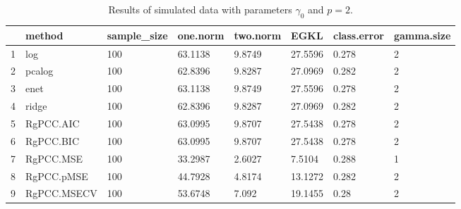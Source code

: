 \begin{table}[ht]
\centering
\begin{tabular}{rlllllll}
  \hline
 & method & sample\_size & one.norm & two.norm & EGKL & class.error & gamma.size \\ 
  \hline
1 & log & 100 & 63.1138 & 9.8749 & 27.5596 & 0.278 & 2 \\ 
  2 & pcalog & 100 & 62.8396 & 9.8287 & 27.0969 & 0.282 & 2 \\ 
  3 & enet & 100 & 63.1138 & 9.8749 & 27.5596 & 0.278 & 2 \\ 
  4 & ridge & 100 & 62.8396 & 9.8287 & 27.0969 & 0.282 & 2 \\ 
  5 & RgPCC.AIC & 100 & 63.0995 & 9.8707 & 27.5438 & 0.278 & 2 \\ 
  6 & RgPCC.BIC & 100 & 63.0995 & 9.8707 & 27.5438 & 0.278 & 2 \\ 
  7 & RgPCC.MSE & 100 & 33.2987 & 2.6027 & 7.5104 & 0.288 & 1 \\ 
  8 & RgPCC.pMSE & 100 & 44.7928 & 4.8174 & 13.1272 & 0.282 & 2 \\ 
  9 & RgPCC.MSECV & 100 & 53.6748 & 7.092 & 19.1455 & 0.28 & 2 \\ 
   \hline
\end{tabular}
\caption{Results of simulated data with parameters $\gamma_0$ and $p =2$. } 
\label{fig-0-debug-2-metrics-p}
\end{table}
